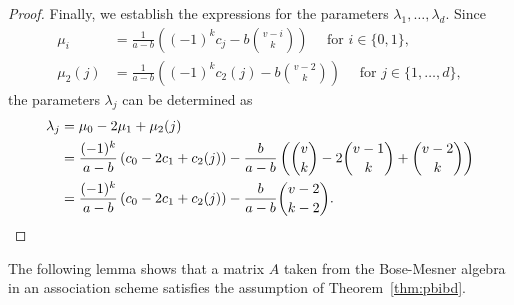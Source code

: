 \documentclass[11pt]{article}
\begin{document}
\begin{proof}
Finally, we establish the expressions for the parameters $\lambda_1,\ldots,\lambda_d$. 
Since 
\begin{align*}
\mu_i&=\frac{1}{a-b}\left((-1)^{k} c_{j}-b\binom{v-i}{k}\right)\quad \text{ for }i\in\{0,1\},\\  
\mu_{2}(j)&=\frac{1}{a-b}\left((-1)^k c_{2}(j)-b\binom{v-2}{k}\right)\quad \text{ for }j\in\{1,\ldots,d\},   
\end{align*}
the parameters $\lambda_j$ can be determined as 
\begin{align*}
\lambda_j&=\mu_0-2\mu_1+\mu_{2}(j)\\
    &=\frac{(-1)^k}{a-b}\left(c_0-2c_1+c_{2}(j)\right)-\frac{b}{a-b}\left(\binom{v}{k}-2\binom{v-1}{k}+\binom{v-2}{k}\right)\\
    &=\frac{(-1)^k}{a-b}\left(c_0-2c_1+c_{2}(j)\right)-\frac{b}{a-b}\binom{v-2}{k-2}.\qedhere
\end{align*}
\end{proof}

The following lemma shows that a matrix $A$ taken from the Bose-Mesner algebra in an association scheme satisfies the assumption of Theorem~\ref{thm:pbibd}.  
\end{document}
